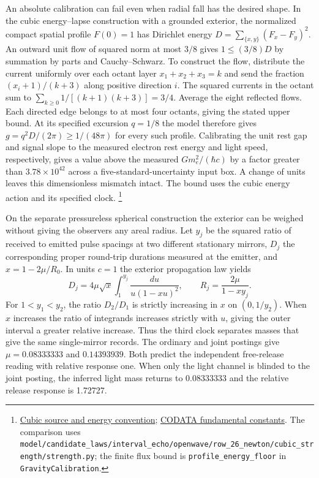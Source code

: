 \documentclass[11pt]{article}
\begin{document}
An absolute calibration can fail even when radial fall has the desired
shape. In the cubic energy--lapse construction with a grounded exterior,
the normalized compact spatial profile $F(0)=1$ has Dirichlet energy
$D=\sum_{\{x,y\}}(F_x-F_y)^2$. An outward unit flow of squared norm
at most $3/8$ gives $1\le(3/8)D$ by summation by parts and
Cauchy--Schwarz. To construct the flow, distribute the current
uniformly over each octant layer $x_1+x_2+x_3=k$ and send the
fraction $(x_i+1)/(k+3)$ along positive direction $i$. The squared
currents in the octant sum to $\sum_{k\ge0}1/[(k+1)(k+3)]=3/4$.
Average the eight reflected flows. Each directed edge belongs to at
most four octants, giving the stated upper bound. At its specified
excursion $q=1/8$ the model therefore gives
$g=q^2D/(2\pi)\ge1/(48\pi)$ for every such profile.
Calibrating the unit rest gap and signal slope to the measured electron
rest energy and light speed, respectively, gives a value above the
measured $Gm_e^2/(\hbar c)$ by a factor greater than
$3.78\times10^{42}$ across a five-standard-uncertainty input box.
A change of units leaves this dimensionless mismatch intact.
The bound uses the cubic energy action and its specified clock.%
\footnote{\href{https://github.com/FloatingPragma/observer-patch-holography/blob/374b2390801842d38de9b9c326e79a8ab29a6be5/model/openwave_universal_energy_geometry/source.py}{Cubic source and energy convention};
\href{https://physics.nist.gov/cuu/Constants/}{CODATA fundamental constants}. The comparison uses \nolinkurl{model/candidate_laws/interval_echo/openwave/row_26_newton/cubic_strength/strength.py}; the finite flux bound is \texttt{profile\_energy\_floor} in \texttt{GravityCalibration}.}

On the separate pressureless spherical construction the exterior
can be weighed without giving the observers any areal radius.
Let $y_j$ be the squared ratio of received to emitted pulse spacings
at two different stationary mirrors, $D_j$ the corresponding
proper round-trip durations measured at the emitter, and
$x=1-2\mu/R_0$. In units $c=1$ the exterior propagation law yields
\[
 D_j=4\mu\sqrt{x}\int_1^{y_j}\frac{du}{u(1-xu)^2},
 \qquad R_j=\frac{2\mu}{1-xy_j}.
\]
For $1<y_1<y_2$, the ratio $D_2/D_1$ is strictly increasing in
$x$ on $(0,1/y_2)$. When $x$ increases the ratio of integrands
increases strictly with $u$, giving the outer interval a greater
relative increase. Thus the third clock separates masses that give
the same single-mirror records. The ordinary and joint postings
give $\mu=0.08333333$ and $0.14393939$. Both predict the independent
free-release reading with relative response one. When only the light
channel is blinded to the joint posting, the inferred light mass
returns to $0.08333333$ and the relative release response is 1.72727.
\end{document}
